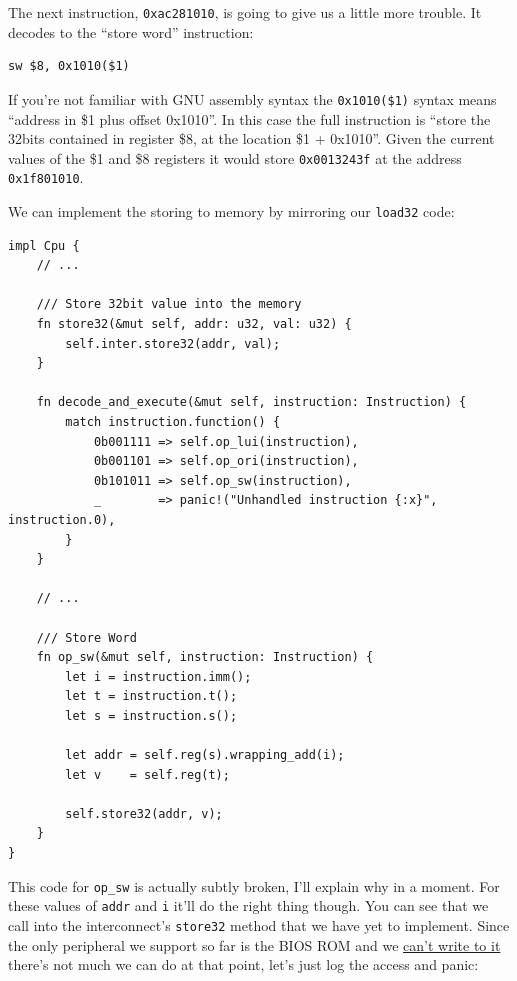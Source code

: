 \documentclass[a4paper]{article}
\newcommand{\code}[1] {\texttt{#1}}
\begin{document}
The next instruction, \code{0xac281010}, is going to give us a
little more trouble. It decodes to the ``store word'' instruction:

\begin{lstlisting}[language=assembly]
sw $8, 0x1010($1)
\end{lstlisting}

If you're not familiar with GNU assembly syntax the
\code{0x1010(\$1)} syntax means ``address in \$1 plus offset
0x1010''. In this case the full instruction is ``store the 32bits contained
in register \$8, at the location \$1 + 0x1010''. Given the current values
of the \$1 and \$8 registers it would store \code{0x0013243f} at the
address \code{0x1f801010}.

We can implement the storing to memory by mirroring our
\code{load32} code:

\begin{lstlisting}
impl Cpu {
    // ...

    /// Store 32bit value into the memory
    fn store32(&mut self, addr: u32, val: u32) {
        self.inter.store32(addr, val);
    }

    fn decode_and_execute(&mut self, instruction: Instruction) {
        match instruction.function() {
            0b001111 => self.op_lui(instruction),
            0b001101 => self.op_ori(instruction),
            0b101011 => self.op_sw(instruction),
            _        => panic!("Unhandled instruction {:x}", instruction.0),
        }
    }

    // ...

    /// Store Word
    fn op_sw(&mut self, instruction: Instruction) {
        let i = instruction.imm();
        let t = instruction.t();
        let s = instruction.s();

        let addr = self.reg(s).wrapping_add(i);
        let v    = self.reg(t);

        self.store32(addr, v);
    }
}
\end{lstlisting}

This code for \code{op\_sw} is actually subtly broken, I'll explain
why in a moment. For these values of \code{addr} and \code{i}
it'll do the right thing though. You can see that we call into the
interconnect's \code{store32} method that we have yet to
implement. Since the only peripheral we support so far is the BIOS ROM
and we
\href{https://github.com/simias/psx-hardware-tests/blob/master/tests/bios_write/main.s}{can't
  write to it} there's not much we can do at that point, let's just
log the access and panic:
\end{document}
